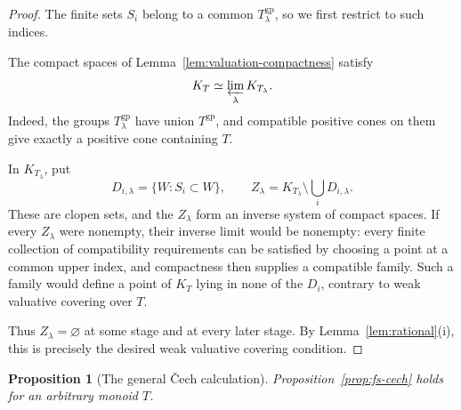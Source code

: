 \documentclass[11pt]{article}
\newtheorem{proposition}[theorem]{Proposition}
\theoremstyle{definition}
\theoremstyle{remark}
\newcommand{\gp}{\mathrm{gp}}
\begin{document}
\begin{proof}
The finite sets \(S_i\) belong to a common \(T_\lambda^{\gp}\), so
we first restrict to such indices.

The compact spaces of Lemma~\ref{lem:valuation-compactness}
satisfy
\[
K_T\simeq\varprojlim_\lambda K_{T_\lambda}.
\]
Indeed, the groups \(T_\lambda^{\gp}\) have union \(T^{\gp}\),
and compatible positive cones on them give exactly a positive
cone containing \(T\).

In \(K_{T_\lambda}\), put
\[
D_{i,\lambda}=\{W:S_i\subset W\},
\qquad
Z_\lambda=K_{T_\lambda}\setminus\bigcup_iD_{i,\lambda}.
\]
These are clopen sets, and the \(Z_\lambda\) form an inverse
system of compact spaces. If every \(Z_\lambda\) were nonempty,
their inverse limit would be nonempty: every finite collection
of compatibility requirements can be satisfied by choosing a
point at a common upper index, and compactness then supplies a
compatible family. Such a family would define a point of
\(K_T\) lying in none of the \(D_i\), contrary to weak valuative
covering over \(T\).

Thus \(Z_\lambda=\varnothing\) at some stage and at every later
stage. By Lemma~\ref{lem:rational}(i), this is precisely the
desired weak valuative covering condition.
\end{proof}

\begin{proposition}[The general \v{C}ech calculation]\label{prop:general-cech}
Proposition~\ref{prop:fs-cech} holds for an arbitrary monoid \(T\).
\end{proposition}
\end{document}
